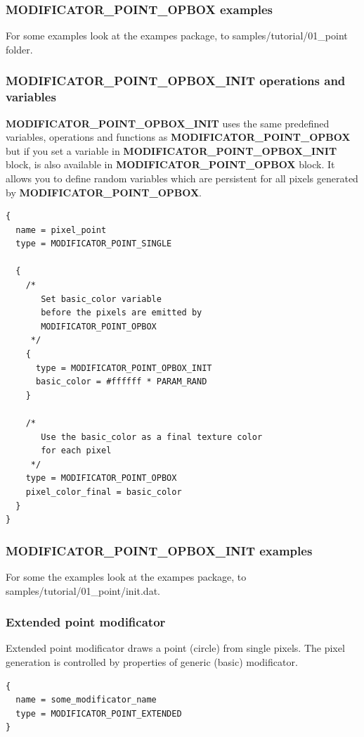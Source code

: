 \documentclass[9pt]{article}
\begin{document}
\subsubsection*{MODIFICATOR\_POINT\_OPBOX examples}

For some examples look at the exampes package, to samples/tutorial/01\_point folder.

\subsubsection*{MODIFICATOR\_POINT\_OPBOX\_INIT operations and variables}

{\bf MODIFICATOR\_POINT\_OPBOX\_INIT} uses the same predefined variables, operations 
and functions as {\bf MODIFICATOR\_POINT\_OPBOX} but if you set a variable in 
{\bf MODIFICATOR\_POINT\_OPBOX\_INIT} block, is also available in 
{\bf MODIFICATOR\_POINT\_OPBOX} block. It allows you to define random 
variables which are persistent for all pixels generated by {\bf MODIFICATOR\_POINT\_OPBOX}.

\begin{verbatim}
{
  name = pixel_point
  type = MODIFICATOR_POINT_SINGLE

  {
    /*
       Set basic_color variable
       before the pixels are emitted by 
       MODIFICATOR_POINT_OPBOX
     */
    {
      type = MODIFICATOR_POINT_OPBOX_INIT
      basic_color = #ffffff * PARAM_RAND
    }

    /*
       Use the basic_color as a final texture color
       for each pixel
     */
    type = MODIFICATOR_POINT_OPBOX
    pixel_color_final = basic_color
  }
}
\end{verbatim}

\subsubsection*{MODIFICATOR\_POINT\_OPBOX\_INIT examples}

For some the examples look at the exampes package, to samples/tutorial/01\_point/init.dat.

\subsubsection{Extended point modificator}

Extended point modificator draws a point (circle)
from single pixels. The pixel generation is controlled by 
properties of generic (basic) modificator.
\begin{verbatim}
{
  name = some_modificator_name
  type = MODIFICATOR_POINT_EXTENDED
}
\end{verbatim}
\end{document}
